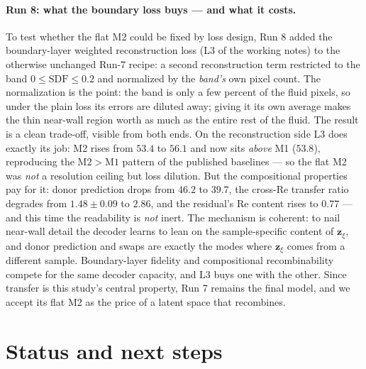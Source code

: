 \documentclass[11pt]{article}
\begin{document}
\paragraph{Run 8: what the boundary loss buys --- and what it costs.}
To test whether the flat M2 could be fixed by loss design, Run 8 added
the boundary-layer weighted reconstruction loss (L3 of the working
notes) to the otherwise unchanged Run-7 recipe: a second reconstruction
term restricted to the band $0 \le \mathrm{SDF} \le 0.2$ and normalized
by the \emph{band's} own pixel count. The normalization is the point:
the band is only a few percent of the fluid pixels, so under the plain
loss its errors are diluted away; giving it its own average makes the
thin near-wall region worth as much as the entire rest of the fluid.
The result is a clean trade-off, visible from both ends. On the
reconstruction side L3 does exactly its job: M2 rises from $53.4$ to
$56.1$ and now sits \emph{above} M1 ($53.8$), reproducing the
$\mathrm{M2} > \mathrm{M1}$ pattern of the published baselines --- so
the flat M2 was \emph{not} a resolution ceiling but loss dilution. But
the compositional properties pay for it: donor prediction drops from
$46.2$ to $39.7$, the cross-Re transfer ratio degrades from
$1.48 \pm 0.09$ to $2.86$, and the residual's Re content rises to
$0.77$ --- and this time the readability is \emph{not} inert. The
mechanism is coherent: to nail near-wall detail the decoder learns to
lean on the sample-specific content of $\boldsymbol{z}_{\xi}$, and
donor prediction and swaps are exactly the modes where
$\boldsymbol{z}_{\xi}$ comes from a different sample. Boundary-layer
fidelity and compositional recombinability compete for the same decoder
capacity, and L3 buys one with the other. Since transfer is this
study's central property, Run 7 remains the final model, and we accept
its flat M2 as the price of a latent space that recombines.

\section{Status and next steps}
\end{document}
